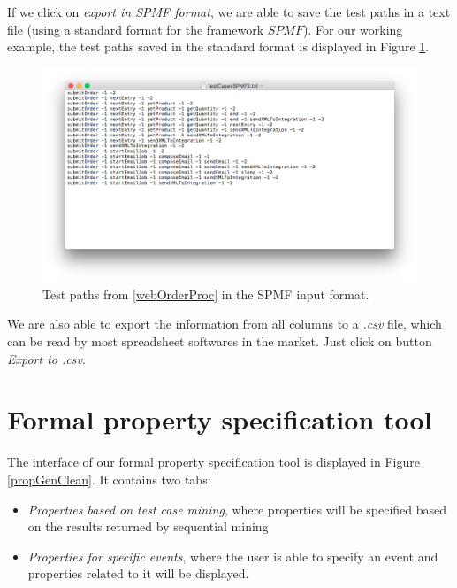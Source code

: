 If we click on \textit{export in SPMF format}, we are able to save the test paths in a text file (using a standard format for the framework $SPMF$). For our working example, the test paths saved in the standard format is displayed in Figure \ref{resultsSPMFFile}.

\begin{figure}[htb]
\centering
\includegraphics[width=\textwidth]{figuras/resultsSPMFFile}
\caption{\label{resultsSPMFFile} Test paths from \ref{webOrderProc} in the SPMF input format.}
\end{figure}

We are also able to export the information from all columns to a \textit{.csv} file, which can be read by most spreadsheet softwares in the market. Just click on button \textit{Export to .csv}.



\section{Formal property specification tool}

The interface of our formal property specification tool is displayed in Figure \ref{propGenClean}. It contains two tabs: 
\begin{itemize}
\item \textit{Properties based on test case mining}, where properties will be specified based on the results returned by sequential mining
\item \textit{Properties for specific events}, where the user is able to specify an event and properties related to it will be displayed.
\end{itemize}

